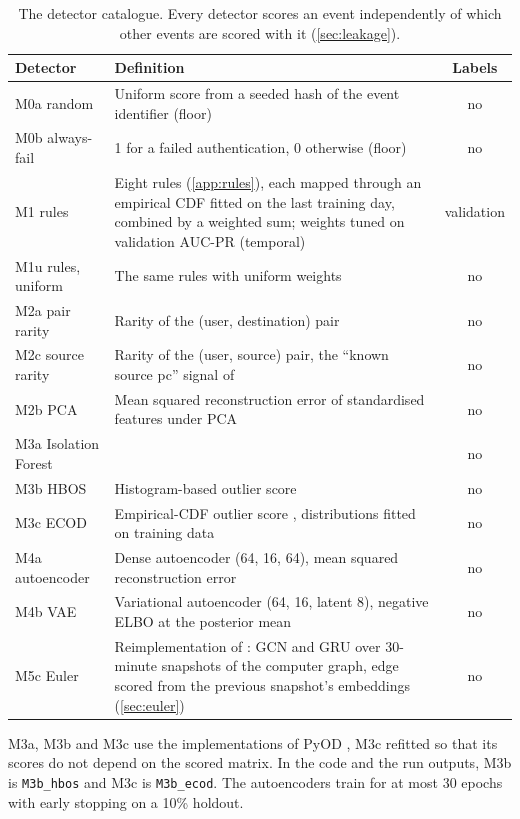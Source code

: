 \documentclass[11pt,a4paper]{article}
\begin{document}
\begin{table}[t]
\centering
\small
\begin{threeparttable}
\caption{The detector catalogue. Every detector scores an event independently of which other events are scored with it (\cref{sec:leakage}).}
\label{tab:detectors}
\begin{tabular}{@{}lp{9.2cm}c@{}}
\toprule
Detector & Definition & Labels \\
\midrule
M0a random & Uniform score from a seeded hash of the event identifier (floor) & no \\
M0b always-fail & 1 for a failed authentication, 0 otherwise (floor) & no \\
M1 rules & Eight rules (\cref{app:rules}), each mapped through an empirical CDF fitted on the last training day, combined by a weighted sum; weights tuned on validation AUC-PR (temporal) & validation \\
M1u rules, uniform & The same rules with uniform weights & no \\
M2a pair rarity & Rarity of the (user, destination) pair & no \\
M2c source rarity & Rarity of the (user, source) pair, the \enquote{known source pc} signal of \textcite{garchery2020adsage} & no \\
M2b PCA & Mean squared reconstruction error of standardised features under PCA \parencite{lakhina2004} & no \\
M3a Isolation Forest & \parencite{liu2008iforest} & no \\
M3b HBOS & Histogram-based outlier score \parencite{goldstein2012hbos} & no \\
M3c ECOD & Empirical-CDF outlier score \parencite{li2022ecod}, distributions fitted on training data & no \\
M4a autoencoder & Dense autoencoder (64, 16, 64), mean squared reconstruction error & no \\
M4b VAE & Variational autoencoder \parencite{kingma2014vae} (64, 16, latent 8), negative ELBO at the posterior mean & no \\
M5c Euler & Reimplementation of \textcite{king2022euler}: GCN \parencite{kipf2017gcn} and GRU over 30-minute snapshots of the computer graph, edge scored from the previous snapshot's embeddings (\cref{sec:euler}) & no \\
\bottomrule
\end{tabular}
\begin{tablenotes}\footnotesize
\item M3a, M3b and M3c use the implementations of PyOD \parencite{zhao2019pyod}, M3c refitted so that its scores do not depend on the scored matrix. In the code and the run outputs, M3b is \texttt{M3b\_hbos} and M3c is \texttt{M3b\_ecod}. The autoencoders train for at most 30 epochs with early stopping on a 10\% holdout.
\end{tablenotes}
\end{threeparttable}
\end{table}
\end{document}
